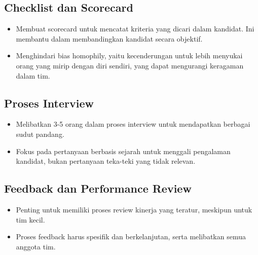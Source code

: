 \documentclass{article}
\begin{document}
\subsection{Checklist dan Scorecard}
\begin{itemize}
    \item Membuat scorecard untuk mencatat kriteria yang dicari dalam kandidat. Ini membantu dalam membandingkan kandidat secara objektif.
    \item Menghindari bias homophily, yaitu kecenderungan untuk lebih menyukai orang yang mirip dengan diri sendiri, yang dapat mengurangi keragaman dalam tim.
\end{itemize}

\subsection{Proses Interview}
\begin{itemize}
    \item Melibatkan 3-5 orang dalam proses interview untuk mendapatkan berbagai sudut pandang.
    \item Fokus pada pertanyaan berbasis sejarah untuk menggali pengalaman kandidat, bukan pertanyaan teka-teki yang tidak relevan.
\end{itemize}

\subsection{Feedback dan Performance Review}
\begin{itemize}
    \item Penting untuk memiliki proses review kinerja yang teratur, meskipun untuk tim kecil.
    \item Proses feedback harus spesifik dan berkelanjutan, serta melibatkan semua anggota tim.
\end{itemize}
\end{document}

